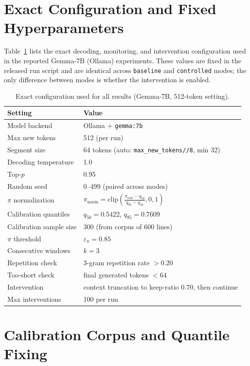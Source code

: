 \documentclass{article}
\begin{document}
\appendix

\section{Exact Configuration and Fixed Hyperparameters}\label{app:config}

Table~\ref{tab:config} lists the exact decoding, monitoring, and intervention configuration used in the reported Gemma-7B (Ollama) experiments. These values are fixed in the released run script and are identical across \texttt{baseline} and \texttt{controlled} modes; the only difference between modes is whether the intervention is enabled.

\begin{table}[t]
\centering
\small
\begin{tabular}{ll}
\toprule
Setting & Value \\
\midrule
Model backend & Ollama + \texttt{gemma:7b} \\
Max new tokens & 512 (per run) \\
Segment size & 64 tokens (auto: \texttt{max\_new\_tokens//8}, min 32) \\
Decoding temperature & 1.0 \\
Top-$p$ & 0.95 \\
Random seed & 0--499 (paired across modes) \\
\midrule
$\pi$ normalization & $\pi_\text{norm}=\mathrm{clip}\left(\frac{\pi_\text{raw}-q_{50}}{q_{95}-q_{50}},0,1\right)$ \\
Calibration quantiles & $q_{50}=0.5422$, $q_{95}=0.7609$ \\
Calibration sample size & 300 (from corpus of 600 lines) \\
$\pi$ threshold & $\varepsilon_\pi=0.85$ \\
Consecutive windows & $k=3$ \\
Repetition check & 3-gram repetition rate $>0.20$ \\
Too-short check & final generated tokens $<64$ \\
\midrule
Intervention & context truncation to keep-ratio 0.70, then continue \\
Max interventions & 100 per run \\
\bottomrule
\end{tabular}
\caption{Exact configuration used for all results (Gemma-7B, 512-token setting).}
\label{tab:config}
\end{table}

\section{Calibration Corpus and Quantile Fixing}\label{app:calibration}
\end{document}
